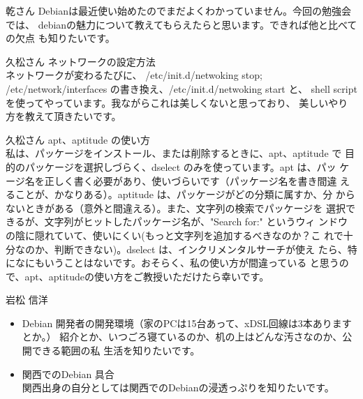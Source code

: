 \documentclass[cjk,dvipdfmx]{beamer}
\begin{document}
\begin{frame}{乾さん}
Debianは最近使い始めたのでまだよくわかっていません。今回の勉強会では、
debianの魅力について教えてもらえたらと思います。できれば他と比べての欠点
も知りたいです。
\end{frame}

\begin{frame}{久松さん}
ネットワークの設定方法\\
 ネットワークが変わるたびに、 /etc/init.d/netwoking stop;
 /etc/network/interfaces の書き換え、/etc/init.d/netwoking start と、
 shell script を使ってやっています。我ながらこれは美しくないと思っており、
 美しいやり方を教えて頂きたいです。
\end{frame}

\begin{frame}{久松さん}
 apt、aptitude の使い方\\
 私は、パッケージをインストール、または削除するときに、apt、aptitude で
 目的のパッケージを選択しづらく、dselect のみを使っています。apt は、パッ
 ケージ名を正しく書く必要があり、使いづらいです（パッケージ名を書き間違
 えることが、かなりある）。aptitude は、パッケージがどの分類に属すか、分
 からないときがある（意外と間違える）。また、文字列の検索でパッケージを
 選択できるが、文字列がヒットしたパッケージ名が、"Search for:" というウィ
 ンドウの陰に隠れていて、使いにくい(もっと文字列を追加するべきなのか？こ
 れで十分なのか、判断できない)。dselect は、インクリメンタルサーチが使え
 たら、特になにもいうことはないです。おそらく、私の使い方が間違っている
 と思うので、apt、aptitudeの使い方をご教授いただけたら幸いです。
\end{frame}
\begin{frame}{岩松 信洋}

\begin{itemize}
 \item  Debian 開発者の開発環境（家のPCは15台あって、xDSL回線は3本ありますとか。）
	紹介とか、いつごろ寝ているのか、机の上はどんな汚さなのか、公開できる範囲の私
	生活を知りたいです。
	
 \item 関西でのDebian 具合\\
	関西出身の自分としては関西でのDebianの浸透っぷりを知りたいです。
\end{itemize}
\end{frame}
\end{document}
